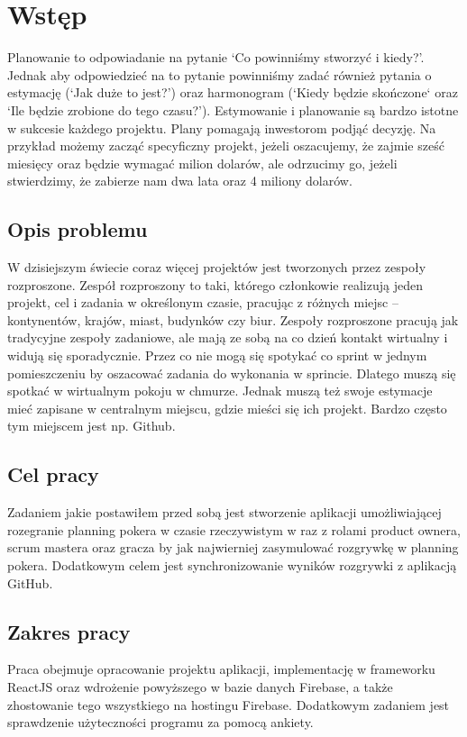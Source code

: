 ﻿\chapter*{Wstęp}

Planowanie to odpowiadanie na pytanie `Co powinniśmy stworzyć i kiedy?'.
Jednak aby odpowiedzieć na to pytanie powinniśmy zadać również pytania o estymację
(`Jak duże to jest?') oraz harmonogram (`Kiedy będzie skończone` oraz `Ile będzie zrobione do tego czasu?'). Estymowanie i planowanie są bardzo istotne w sukcesie każdego projektu. Plany pomagają inwestorom podjąć decyzję. Na przykład możemy zacząć specyficzny projekt, jeżeli oszacujemy, że zajmie sześć miesięcy oraz będzie wymagać milion dolarów, ale odrzucimy go, jeżeli stwierdzimy, że zabierze nam dwa lata oraz 4 miliony dolarów.\cite{Cohen_2006}

\section*{Opis problemu}

W dzisiejszym świecie coraz więcej projektów jest tworzonych przez zespoły rozproszone. Zespół rozproszony to taki, którego członkowie realizują jeden projekt, cel i zadania w określonym czasie, pracując z różnych miejsc – kontynentów, krajów, miast, budynków czy biur. Zespoły rozproszone pracują jak tradycyjne zespoły zadaniowe, ale mają ze sobą na co dzień kontakt wirtualny i widują się sporadycznie.\cite{www_rozproszony} Przez co nie mogą się spotykać co sprint w jednym pomieszczeniu by oszacować zadania do wykonania w sprincie. Dlatego muszą się spotkać w wirtualnym pokoju w chmurze. Jednak muszą też swoje estymacje mieć zapisane w centralnym miejscu, gdzie mieści się ich projekt. Bardzo często tym miejscem jest np. Github.

\section*{Cel pracy}

Zadaniem jakie postawiłem przed sobą jest stworzenie aplikacji umożliwiającej rozegranie planning pokera w czasie rzeczywistym w raz z rolami product ownera, scrum mastera oraz gracza by jak najwierniej zasymulować rozgrywkę w planning pokera. Dodatkowym celem jest synchronizowanie wyników rozgrywki z aplikacją GitHub.

\section*{Zakres pracy}

Praca obejmuje opracowanie projektu aplikacji, implementację w frameworku ReactJS oraz wdrożenie powyższego w bazie danych Firebase, a także zhostowanie tego wszystkiego na hostingu Firebase. Dodatkowym zadaniem jest sprawdzenie użyteczności programu za pomocą ankiety.

